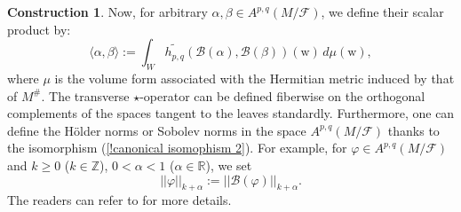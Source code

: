 \documentclass[12pt]{amsart}
\numberwithin{equation}{section}
\theoremstyle{definition}
\theoremstyle{definition}
\newtheorem{Construction}  [theorem]     {Construction}
\theoremstyle{definition}
\renewcommand{\1}{\mathsf{1}}
\renewcommand{\>}{\rightarrow}
\def\mb{\mathbb}
\def\mc{\mathcal}
\def\v{\varphi}
\theoremstyle{plain} %
\theoremstyle{plain} %
\theoremstyle{plain} %
\begin{document}
\begin{Construction}
		Now, for arbitrary $\alpha,\beta\in A^{p,q}(M/\mc F)$, we define their scalar product by:
		$$\label{scalar}
		\langle\alpha,\beta\rangle:=\int_W \widetilde{h_{p,q}}\left(\mathscr{B}(\alpha),\mathscr B(\beta)\right)(\textrm{w})\,d\mu(\textrm{w}),
		$$
		where $\mu$ is the volume form associated with the Hermitian  metric induced by that of $M^{\#}$.
		The transverse $\star$-operator can be defined fiberwise on the orthogonal complements of the spaces tangent to the leaves standardly. Furthermore, one can define the H\"older norms or Sobolev norms in the space $A^{p,q}(M/\mc F)$ thanks to the isomorphism (\ref{!canonical isomophism 2}). For example, for  $\v\in A^{p,q}(M/\mc F)$ and $k\geq 0$ ($k\in \mb Z$), $0<\alpha<1$ ($\alpha\in\mb R$), we set
		\begin{equation*}\label{Holder foliation}
			||\varphi||_{k+\alpha}:=||\mathscr{B}(\varphi)||_{k+\alpha}.
		\end{equation*}
		The readers can refer to \cite[Section 3.5.6]{EKA90} for more details.
	\end{Construction}
	
\end{document}
